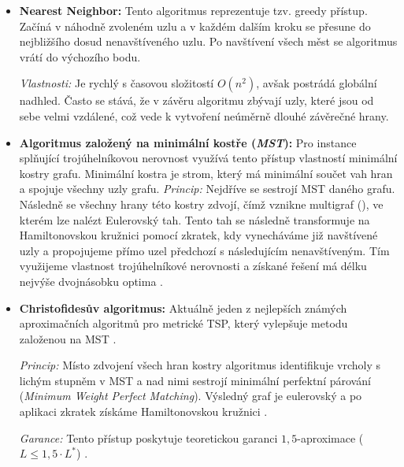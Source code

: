 \begin{itemize}
    \item \textbf{Nearest Neighbor:} 
    Tento algoritmus reprezentuje tzv. greedy přístup. Začíná v náhodně zvoleném uzlu a v každém dalším kroku se přesune do nejbližšího dosud nenavštíveného uzlu. Po navštívení všech měst se algoritmus vrátí do výchozího bodu. 
    
    \textit{Vlastnosti:} Je rychlý s časovou složitostí $O(n^2)$, avšak postrádá globální nadhled. Často se stává, že v závěru algoritmu zbývají uzly, které jsou od sebe velmi vzdálené, což vede k vytvoření neúměrně dlouhé závěrečné hrany.
    
    \item \textbf{Algoritmus založený na minimální kostře (\textit{MST}):} 
    Pro instance splňující trojúhelníkovou nerovnost využívá tento přístup vlastností minimální kostry grafu. 
    Minimální kostra je strom, který má minimální součet vah hran a spojuje všechny uzly grafu.
    \textit{Princip:} Nejdříve se sestrojí MST daného grafu. Následně se všechny hrany této kostry zdvojí, čímž vznikne multigraf (), ve kterém lze nalézt Eulerovský tah. Tento tah se následně transformuje na Hamiltonovskou kružnici pomocí zkratek, kdy vynecháváme již navštívené uzly a propojujeme přímo uzel předchozí s následujícím nenavštíveným. Tím využijeme vlastnost trojúhelníkové nerovnosti a získané řešení má délku nejvýše dvojnásobku optima \cite{jancar_vsb_ti_skript}.

    \item \textbf{Christofidesův algoritmus:} 
    Aktuálně jeden z nejlepších známých aproximačních algoritmů pro metrické TSP, který vylepšuje metodu založenou na MST \cite{christofides1976tsp}.
    
    \textit{Princip:} Místo zdvojení všech hran kostry algoritmus identifikuje vrcholy s lichým stupněm v MST a nad nimi sestrojí minimální perfektní párování (\textit{Minimum Weight Perfect Matching}). Výsledný graf je eulerovský a po aplikaci zkratek získáme Hamiltonovskou kružnici \cite{christofides1976tsp}.
    
    \textit{Garance:} Tento přístup poskytuje teoretickou garanci $1,5$-aproximace ($L \leq 1,5 \cdot L^*$) \cite{christofides1976tsp}.
\end{itemize}




